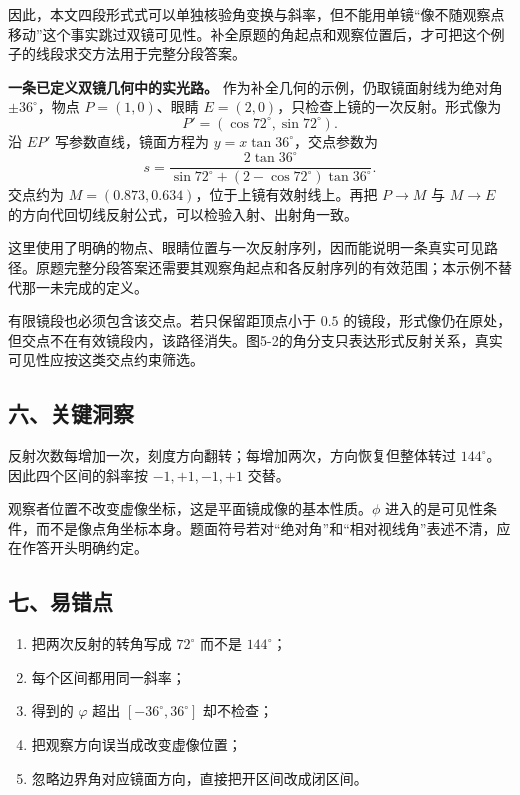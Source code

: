 \documentclass[12pt,a4paper,UTF8]{ctexart}
\newcommand{\tightlist}{\setlength{\itemsep}{0pt}\setlength{\parskip}{0pt}}
\begin{document}
因此，本文四段形式式可以单独核验角变换与斜率，但不能用单镜``像不随观察点移动''这个事实跳过双镜可见性。补全原题的角起点和观察位置后，才可把这个例子的线段求交方法用于完整分段答案。

\textbf{一条已定义双镜几何中的实光路。}
作为补全几何的示例，仍取镜面射线为绝对角 \(\pm36^\circ\)，物点
\(P=(1,0)\)、眼睛 \(E=(2,0)\)，只检查上镜的一次反射。形式像为 \[
P'=(\cos72^\circ,\sin72^\circ).
\] 沿 \(EP'\) 写参数直线，镜面方程为 \(y=x\tan36^\circ\)，交点参数为 \[
s=\frac{2\tan36^\circ}{\sin72^\circ+(2-\cos72^\circ)\tan36^\circ}.
\] 交点约为 \(M=(0.873,0.634)\)，位于上镜有效射线上。再把 \(P\to M\) 与
\(M\to E\) 的方向代回切线反射公式，可以检验入射、出射角一致。

这里使用了明确的物点、眼睛位置与一次反射序列，因而能说明一条真实可见路径。原题完整分段答案还需要其观察角起点和各反射序列的有效范围；本示例不替代那一未完成的定义。

有限镜段也必须包含该交点。若只保留距顶点小于 \(0.5\)
的镜段，形式像仍在原处，但交点不在有效镜段内，该路径消失。图5-2的角分支只表达形式反射关系，真实可见性应按这类交点约束筛选。

\subsection{六、关键洞察}\label{ux516dux5173ux952eux6d1eux5bdf-4}

反射次数每增加一次，刻度方向翻转；每增加两次，方向恢复但整体转过
\(144^\circ\)。因此四个区间的斜率按 \(-1,+1,-1,+1\) 交替。

观察者位置不改变虚像坐标，这是平面镜成像的基本性质。\(\phi\)
进入的是可见性条件，而不是像点角坐标本身。题面符号若对``绝对角''和``相对视线角''表述不清，应在作答开头明确约定。

\subsection{七、易错点}\label{ux4e03ux6613ux9519ux70b9-4}

\begin{enumerate}
\def\labelenumi{\arabic{enumi}.}
\tightlist
\item
  把两次反射的转角写成 \(72^\circ\) 而不是 \(144^\circ\)；
\item
  每个区间都用同一斜率；
\item
  得到的 \(\varphi\) 超出 \([-36^\circ,36^\circ]\) 却不检查；
\item
  把观察方向误当成改变虚像位置；
\item
  忽略边界角对应镜面方向，直接把开区间改成闭区间。
\end{enumerate}
\end{document}
